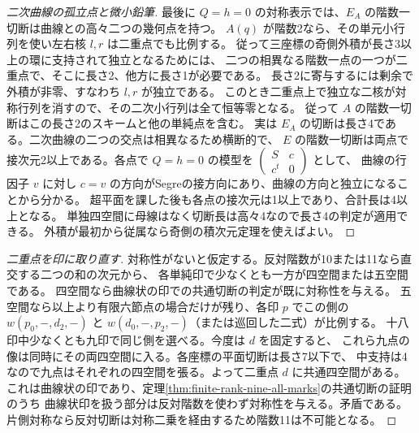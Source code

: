 \begin{proof}[二次曲線の孤立点と微小鉛筆]
最後に $Q=h=0$ の対称表示では、$E_A$ の階数一切断は曲線との高々二つの幾何点を持つ。
$A(q)$ が階数2なら、その単元小行列を使い左右核 $l,r$ は二重点でも比例する。
従って三座標の奇側外積が長さ3以上の環に支持されて独立となるためには、
二つの相異なる階数一点の一つが二重点で、そこに長さ2、他方に長さ1が必要である。
長さ2に寄与するには剰余で外積が非零、すなわち $l,r$ が独立である。
このとき二重点上で独立な二核が対称行列を消すので、その二次小行列は全て恒等零となる。
従って $A$ の階数一切断はこの長さ2のスキームと他の単純点を含む。
実は $E_A$ の切断は長さ4である。二次曲線の二つの交点は相異なるため横断的で、
$E$ の階数一切断は両点で接次元2以上である。各点で $Q=h=0$ の模型を
$\left(\begin{smallmatrix}S&c\\c^t&0\end{smallmatrix}\right)$ として、
曲線の行因子 $v$ に対し $c=v$ の方向がSegreの接方向にあり、曲線の方向と独立になることから分かる。
超平面を課した後も各点の接次元は1以上であり、合計長は4以上となる。
単独四空間に母線はなく切断長は高々4なので長さ4の判定が適用できる。
外積が最初から従属なら奇側の積次元定理を使えばよい。
\end{proof}
\begin{proof}[二重点を印に取り直す]
対称性がないと仮定する。反対階数が10または11なら直交する二つの和の次元から、
各単純印で少なくとも一方が四空間または五空間である。
四空間なら曲線状の印での共通切断の判定が既に対称性を与える。
五空間なら以上より有限六節点の場合だけが残り、各印 $p$ でこの側の
$w(p_0,-,d_2,-)$ と $w(d_0,-,p_2,-)$（または巡回した二式）が比例する。
十八印中少なくとも九印で同じ側を選べる。今度は $d$ を固定すると、
これら九点の像は同時にその両四空間に入る。各座標の平面切断は長さ7以下で、
中支持は4なので九点はそれぞれの四空間を張る。よって二重点 $d$ に共通四空間がある。
これは曲線状の印であり、定理\ref{thm:finite-rank-nine-all-marks}の共通切断の証明のうち
曲線状印を扱う部分は反対階数を使わず対称性を与える。矛盾である。
片側対称なら反対切断は対称二乗を経由するため階数11は不可能となる。
\end{proof}
